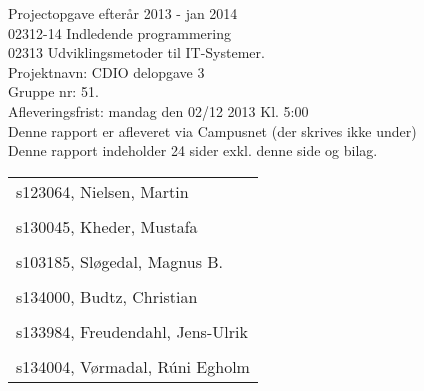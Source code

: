 \thispagestyle{empty}
\begin{titlepage}
\bfseries
\begin{flushleft}
Projectopgave efterår 2013 - jan 2014\\
02312-14 Indledende programmering\\
02313 Udviklingsmetoder til IT-Systemer.\\
Projektnavn: CDIO delopgave 3\\
Gruppe nr: 51.\\
Afleveringsfrist: mandag den 02/12 2013 Kl. 5:00\\
Denne rapport er afleveret via Campusnet (der skrives ikke under)\\
Denne rapport indeholder 24 sider exkl. denne side og bilag.\\
\end{flushleft}
\vspace{5\baselineskip}
\begin{center}
\begin{tabular}{l}
s123064, Nielsen, Martin\\
\\
s130045, Kheder, Mustafa\\
\\
s103185, Sløgedal, Magnus B.\\
\\
s134000, Budtz, Christian\\
\\
s133984, Freudendahl, Jens-Ulrik\\
\\
s134004, Vørmadal, Rúni Egholm\\
\end{tabular}
\end{center}

\end{titlepage}

\newpage